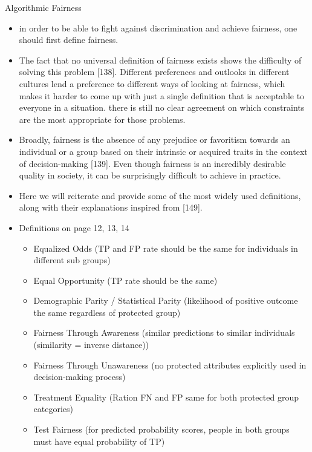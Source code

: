 \documentclass[12pt, a4paper, oneside]{book}   	%
\begin{document}
			Algorithmic Fairness
			\begin{itemize}
				\item in order to be able to fight against discrimination and achieve fairness, one should first define fairness. \autocite{Mehrabi_2021}
				\item The fact that no universal definition of fairness exists shows the difficulty of solving this problem [138]. Different preferences and outlooks in different cultures lend a preference to different ways of looking at fairness, which makes it harder to come up with just a single definition that is acceptable to everyone in a situation. there is still no clear agreement on which constraints are the most appropriate for those problems. \autocite{Mehrabi_2021}
				\item Broadly, fairness is the absence of any prejudice or favoritism towards an individual or a group based on their intrinsic or acquired traits in the context of decision-making [139]. Even though fairness is an incredibly desirable quality in society, it can be surprisingly difficult to achieve in practice. \autocite{Mehrabi_2021}
				\item Here we will reiterate and provide some of the most widely used definitions, along with their explanations inspired from [149].\autocite{Mehrabi_2021}
				\item Definitions on page 12, 13, 14 \autocite{Mehrabi_2021}
				\begin{itemize}
					\item Equalized Odds (TP and FP rate should be the same for individuals in different sub groups) \autocite{Mehrabi_2021}
					\item Equal Opportunity (TP rate should be the same) \autocite{Mehrabi_2021}
					\item Demographic Parity / Statistical Parity (likelihood of positive outcome the same regardless of protected group) \autocite{Mehrabi_2021}
					\item Fairness Through Awareness (similar predictions to similar individuals (similarity = inverse distance)) \autocite{Mehrabi_2021}
					\item Fairness Through Unawareness (no protected attributes explicitly used in decision-making process) \autocite{Mehrabi_2021}
					\item Treatment Equality (Ration FN and FP same for both protected group categories) \autocite{Mehrabi_2021}
					\item Test Fairness (for predicted probability scores, people in both groups must have equal probability of TP) \autocite{Mehrabi_2021}

\end{itemize}
\end{itemize}
\end{document}
